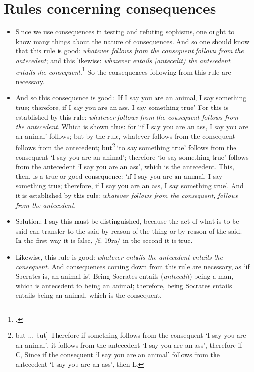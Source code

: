 \section{Rules concerning consequences}
\begin{itemize}
\item[1.] Since we use consequences in testing and refuting sophisms, one ought to know many things about the nature of consequences. And so one should know that this rule is good: \textit{whatever follows from the consequent follows from the antecedent}; and this likewise: \textit{whatever entails (antecedit) the antecedent entails the consequent}.\footnote{\cite[p. 62.9; p. 67.9; p. 200.11]{BurleyDPAL}.} So the consequences following from this rule are necessary.
\item[2.] And so this consequence is good: `If I say you are an animal, I say something true; therefore, if I say you are an ass, I say something true'. For this is established by this rule: \textit{whatever follows from the consequent follows from the antecedent}. Which is shown thus: for `if I say you are an ass, I say you are an animal' follows; but by the rule, whatever follows from the consequent follows from the antecedent; but\footnote{but ... but] Therefore if something follows from the consequent `I say you are an animal', it follows from the antecedent `I say you are an ass', therefore if C, Since if the consequent `I say you are an animal' follows from the antecedent `I say you are an ass', then L.} `to say something true' follows from the consequent `I say you are an animal'; therefore `to say something true' follows from the antecedent `I say you are an ass', which is the antecedent. This, then, is a true or good consequence: `if I say you are an animal, I say something true; therefore, if I say you are an ass, I say something true'. And it is established by this rule: \textit{whatever follows from the consequent, follows from the antecedent}.
\item[3.] Solution: I say this must be distinguished, because the act of what is to be said can transfer to the said by reason of the thing or by reason of the said. In the first way it is false, /f. 19ra/ in the second it is true.
\item[4.] Likewise, this rule is good: \textit{whatever entails the antecedent entails the consequent}. And consequences coming down from this rule are necessary, as `if Socrates is, an animal is'. Being Socrates entails (\textit{antecedit}) being a man, which is antecedent to being an animal; therefore, being Socrates entails entails being an animal, which is the consequent.

\end{itemize}
